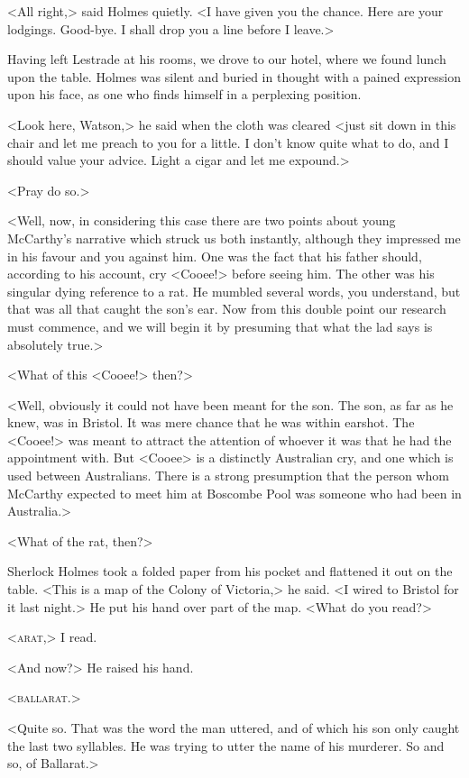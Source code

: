 <All right,> said Holmes quietly. <I have given you the chance. Here are your lodgings. Good-bye. I shall drop you a line before I leave.>

Having left Lestrade at his rooms, we drove to our hotel, where we found lunch upon the table. Holmes was silent and buried in thought with a pained expression upon his face, as one who finds himself in a perplexing position.

<Look here, Watson,> he said when the cloth was cleared <just sit down in this chair and let me preach to you for a little. I don't know quite what to do, and I should value your advice. Light a cigar and let me expound.>

<Pray do so.>

<Well, now, in considering this case there are two points about young McCarthy's narrative which struck us both instantly, although they impressed me in his favour and you against him. One was the fact that his father should, according to his account, cry <Cooee!> before seeing him. The other was his singular dying reference to a rat. He mumbled several words, you understand, but that was all that caught the son's ear. Now from this double point our research must commence, and we will begin it by presuming that what the lad says is absolutely true.>

<What of this <Cooee!> then?>

<Well, obviously it could not have been meant for the son. The son, as far as he knew, was in Bristol. It was mere chance that he was within earshot. The <Cooee!> was meant to attract the attention of whoever it was that he had the appointment with. But <Cooee> is a distinctly Australian cry, and one which is used between Australians. There is a strong presumption that the person whom McCarthy expected to meet him at Boscombe Pool was someone who had been in Australia.>

<What of the rat, then?>

Sherlock Holmes took a folded paper from his pocket and flattened it out on the table. <This is a map of the Colony of Victoria,> he said. <I wired to Bristol for it last night.> He put his hand over part of the map. <What do you read?>

<\textsc{arat},> I read.

<And now?> He raised his hand.

<\textsc{ballarat}.>

<Quite so. That was the word the man uttered, and of which his son only caught the last two syllables. He was trying to utter the name of his murderer. So and so, of Ballarat.>

